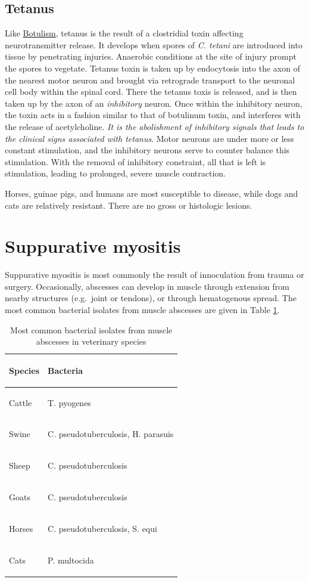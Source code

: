 \documentclass[openany]{report}
\begin{document}
\hypertarget{tetanus}{\subsection{Tetanus}\label{tetanus}}

Like \protect\hyperlink{botulism}{Botulism}, tetanus is the result of a
clostridial toxin affecting neurotransmitter release. It develops when
spores of \emph{C. tetani} are introduced into tissue by penetrating
injuries. Anaerobic conditions at the site of injury prompt the spores
to vegetate. Tetanus toxin is taken up by endocytosis into the axon of
the nearest motor neuron and brought via retrograde transport to the
neuronal cell body within the spinal cord. There the tetanus toxis is
released, and is then taken up by the axon of an \emph{inhibitory}
neuron. Once within the inhibitory neuron, the toxin acts in a fashion
similar to that of botulinum toxin, and interferes with the release of
acetylcholine. \emph{It is the abolishment of inhibitory signals that
leads to the clinical signs associated with tetanus}. Motor neurons are
under more or less constant stimulation, and the inhibitory neurons
serve to counter balance this stimulation. With the removal of
inhibitory constraint, all that is left is stimulation, leading to
prolonged, severe muscle contraction.

Horses, guinae pigs, and humans are most susceptible to disease, while
dogs and cats are relatively resistant. There are no gross or histologic
lesions.

\hypertarget{suppurative-myositis}{\section{Suppurative
myositis}\label{suppurative-myositis}}

Suppurative myositis is most commonly the result of innoculation from
trauma or surgery. Occasionally, abscesses can develop in muscle through
extension from nearby structures (e.g.~joint or tendons), or through
hematogenous spread. The most common bacterial isolates from muscle
abscesses are given in Table \ref{tab:abscess}.

\begin{table}[t]

\caption{\label{tab:abscess}Most common bacterial isolates from muscle abscesses in veterinary species}
\centering
\begin{tabular}{>{\raggedright\arraybackslash}p{15em}>{\em\raggedright\arraybackslash}p{15em}}
\toprule
Species & Bacteria\\
\midrule
Cattle & T. pyogenes\\
Swine & C. pseudotuberculosis, H. parasuis\\
Sheep & C. pseudotuberculosis\\
Goats & C. pseudotuberculosis\\
Horses & C. pseudotuberculosis, S. equi\\
\addlinespace
Cats & P. multocida\\
\bottomrule
\end{tabular}
\end{table}
\end{document}
